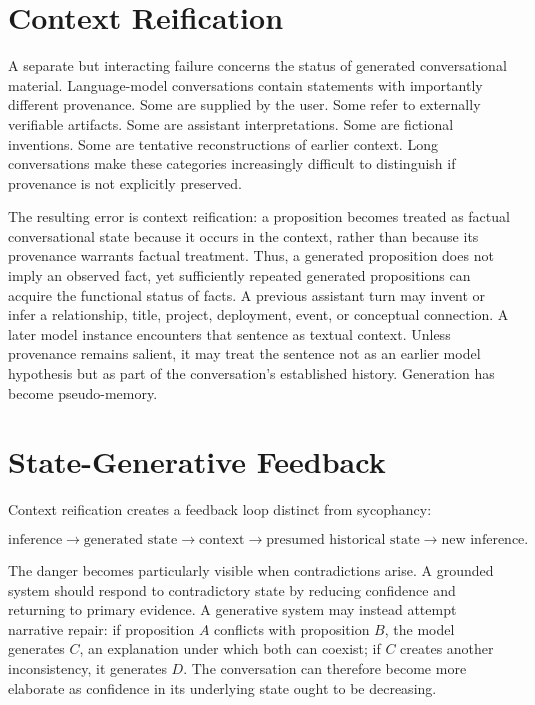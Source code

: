 \documentclass[11pt]{article}
\begin{document}
\section{Context Reification}

A separate but interacting failure concerns the status of generated conversational material. Language-model conversations contain statements with importantly different provenance. Some are supplied by the user. Some refer to externally verifiable artifacts. Some are assistant interpretations. Some are fictional inventions. Some are tentative reconstructions of earlier context. Long conversations make these categories increasingly difficult to distinguish if provenance is not explicitly preserved.

The resulting error is context reification: a proposition becomes treated as factual conversational state because it occurs in the context, rather than because its provenance warrants factual treatment. Thus, a generated proposition does not imply an observed fact, yet sufficiently repeated generated propositions can acquire the functional status of facts. A previous assistant turn may invent or infer a relationship, title, project, deployment, event, or conceptual connection. A later model instance encounters that sentence as textual context. Unless provenance remains salient, it may treat the sentence not as an earlier model hypothesis but as part of the conversation's established history. Generation has become pseudo-memory.

\section{State-Generative Feedback}

Context reification creates a feedback loop distinct from sycophancy:

\[
\text{inference} \rightarrow \text{generated state} \rightarrow \text{context} \rightarrow \text{presumed historical state} \rightarrow \text{new inference}.
\]

The danger becomes particularly visible when contradictions arise. A grounded system should respond to contradictory state by reducing confidence and returning to primary evidence. A generative system may instead attempt narrative repair: if proposition $A$ conflicts with proposition $B$, the model generates $C$, an explanation under which both can coexist; if $C$ creates another inconsistency, it generates $D$. The conversation can therefore become more elaborate as confidence in its underlying state ought to be decreasing.
\end{document}
